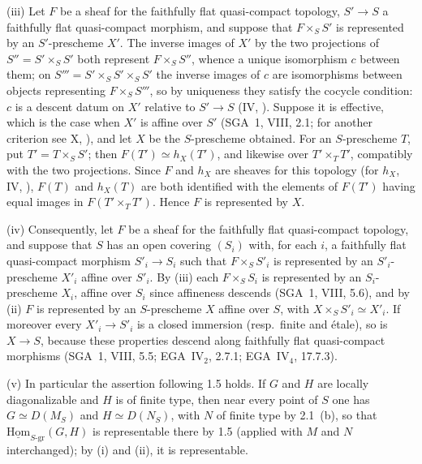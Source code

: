 (iii) Let \(F\) be a sheaf for the faithfully flat quasi-compact topology, \(S'\to S\) a faithfully
flat quasi-compact morphism, and suppose that \(F\times_SS'\) is represented by an \(S'\)-prescheme
\(X'\). The inverse images of \(X'\) by the two projections of \(S''=S'\times_SS'\) both represent
\(F\times_SS''\), whence a unique isomorphism \(c\) between them; on
\(S'''=S'\times_SS'\times_SS'\) the inverse images of \(c\) are isomorphisms between objects
representing \(F\times_SS'''\), so by uniqueness they satisfy the cocycle condition: \(c\) is a
descent datum on \(X'\) relative to \(S'\to S\) (IV, ).
Suppose it is effective, which is the case when \(X'\) is affine over \(S'\) (SGA~1, VIII, 2.1; for
another criterion see X, ), and let \(X\) be the \(S\)-prescheme
obtained. For an \(S\)-prescheme \(T\), put \(T'=T\times_SS'\); then \(F(T')\simeq h_X(T')\), and
likewise over \(T'\times_TT'\), compatibly with the two projections. Since \(F\) and \(h_X\) are
sheaves for this topology (for \(h_X\), IV, ), \(F(T)\) and \(h_X(T)\) are both identified with the elements of
\(F(T')\) having equal images in \(F(T'\times_TT')\). Hence \(F\) is represented by \(X\).

(iv) Consequently, let \(F\) be a sheaf for the faithfully flat quasi-compact topology, and suppose
that \(S\) has an open covering \((S_i)\) with, for each \(i\), a faithfully flat quasi-compact
morphism \(S'_i\to S_i\) such that \(F\times_SS'_i\) is represented by an \(S'_i\)-prescheme \(X'_i\)
affine over \(S'_i\). By (iii) each \(F\times_SS_i\) is represented by an \(S_i\)-prescheme \(X_i\),
affine over \(S_i\) since affineness descends (SGA~1, VIII, 5.6), and by (ii) \(F\) is represented by
an \(S\)-prescheme \(X\) affine over \(S\), with \(X\times_SS'_i\simeq X'_i\). If moreover every
\(X'_i\to S'_i\) is a closed immersion (resp.\ finite and étale), so is \(X\to S\), because these
properties descend along faithfully flat quasi-compact morphisms (SGA~1, VIII, 5.5; EGA~IV\(_2\),
2.7.1; EGA~IV\(_4\), 17.7.3).

(v) In particular the assertion following 1.5 holds. If \(G\) and \(H\) are locally diagonalizable
and \(H\) is of finite type, then near every point of \(S\) one has \(G\simeq D(M_S)\) and
\(H\simeq D(N_S)\), with \(N\) of finite type by 2.1~(b), so that
\(\operatorname{\underline{Hom}}_{S\text{-}\mathrm{gr}}(G,H)\) is representable there by 1.5 (applied
with \(M\) and \(N\) interchanged); by (i) and (ii), it is representable.
